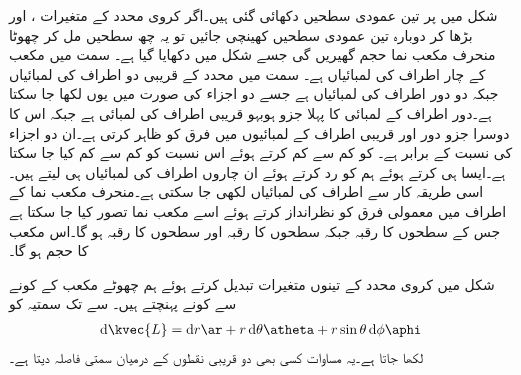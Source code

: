شکل  میں  پر تین عمودی سطحیں دکھائی گئی ہیں۔اگر کروی محدد کے متغیرات ،  اور  بڑھا کر دوبارہ تین عمودی سطحیں کھینچی جائیں تو یہ چھ سطحیں مل کر چھوٹا منحرف مکعب نما حجم گھیریں گی جسے شکل  میں دکھایا گیا ہے۔ سمت میں مکعب کے چار اطراف کی لمبائیاں  ہے۔ سمت میں  محدد کے قریبی دو اطراف کی لمبائیاں  جبکہ دو دور اطراف کی لمبائیاں  ہے جسے دو اجزاء کی صورت میں یوں   لکھا جا سکتا ہے۔دور اطراف کے لمبائی کا پہلا جزو ہوبہو قریبی اطراف کی لمبائی ہے جبکہ اس کا دوسرا جزو دور اور قریبی اطراف کے لمبائیوں میں فرق کو ظاہر کرتی ہے۔ان دو اجزاء کی نسبت   کے برابر ہے۔ کو کم سے کم کرتے ہوئے اس نسبت کو کم سے کم کیا جا سکتا  ہے۔ایسا ہی کرتے ہوئے ہم  کو رد کرتے ہوئے ان چاروں اطراف کی لمبائیاں  ہی لیتے ہیں۔اسی طریقہ کار سے   اطراف کی لمبائیاں   لکھی جا سکتی ہے۔منحرف مکعب نما کے اطراف میں معمولی فرق کو نظرانداز کرتے ہوئے اسے مکعب نما تصور کیا جا سکتا ہے جس کے  سطحوں کا رقبہ  جبکہ  سطحوں کا رقبہ  اور  سطحوں کا رقبہ    ہو گا۔اس مکعب کا حجم  ہو گا۔


شکل  میں کروی محدد کے تینوں متغیرات تبدیل کرتے ہوئے ہم چھوٹے مکعب کے   کونے سے
  کونے پہنچتے ہیں۔ سے  تک سمتیہ کو
\begin{align}\label{مساوات_سمتیہ_کروی_چھوٹا_فاصلہ}
\dif \kvec{L}=\dif r \ar+r \dif \theta \atheta+r\sin \theta \dif \phi \aphi
\end{align}
لکھا جاتا ہے۔یہ مساوات کسی بھی دو قریبی نقطوں کے درمیان سمتی فاصلہ دیتا ہے۔

